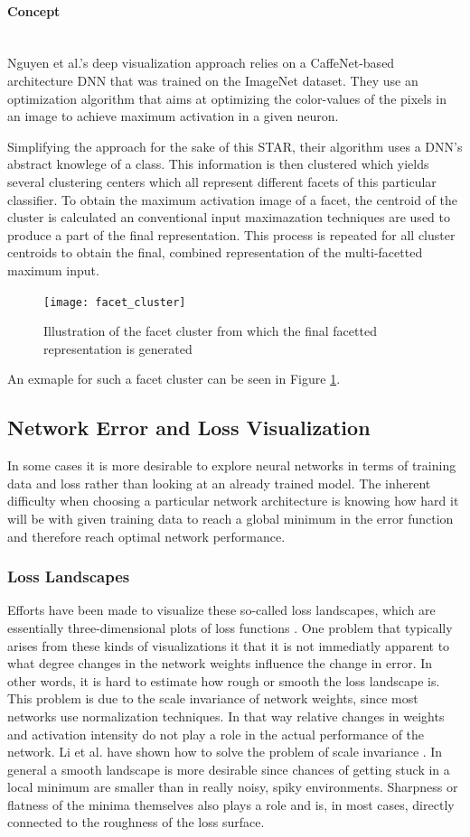 \documentclass{acmsiggraph}               %
\newcommand{\paragraphbr}[1]{\paragraph{#1}\mbox{}\\}
\begin{document}
\paragraphbr{Concept}

Nguyen et al.'s deep visualization approach relies on a CaffeNet-based architecture DNN that was trained on the ImageNet dataset. They use an optimization algorithm that aims at optimizing the color-values of the pixels in an image to achieve maximum activation in a given neuron.

Simplifying the approach for the sake of this STAR, their algorithm uses a DNN's abstract knowlege of a class. This information is then clustered which yields several clustering centers which all represent different facets of this particular classifier. To obtain the maximum activation image of a facet, the centroid of the cluster is calculated an conventional input maximazation techniques are used to produce a part of the final representation. This process is repeated for all cluster centroids to obtain the final, combined representation of the multi-facetted maximum input.

\begin{figure}
\center
\texttt{[image: facet\_cluster]}
\caption{Illustration of the facet cluster from which the final facetted representation is generated \protect\cite{Nguyen2016}}
\label{fig:facet_cluster}
\end{figure}

An exmaple for such a facet cluster can be seen in Figure \ref{fig:facet_cluster}.


\subsection{Network Error and Loss Visualization}
In some cases it is more desirable to explore neural networks in terms of training data and loss rather than looking at an already trained model.
The inherent difficulty when choosing a particular network architecture is knowing how hard it will be with given training data to reach a global minimum in the error function and therefore reach optimal network performance.

\subsubsection{Loss Landscapes}
Efforts have been made to visualize these so-called loss landscapes, which are essentially three-dimensional plots of loss functions \cite{Li2017}.
One problem that typically arises from these kinds of visualizations it that it is not immediatly apparent to what degree changes in the network weights influence the change in error. In other words, it is hard to estimate how rough or smooth the loss landscape is. This problem is due to the scale invariance of network weights, since most networks use normalization techniques. In that way relative changes in weights and activation intensity do not play a role in the actual performance of the network. Li et al. have shown how to solve the problem of scale invariance \cite{Li2017}. In general a smooth landscape is more desirable since chances of getting stuck in a local minimum are smaller than in really noisy, spiky environments. Sharpness or flatness of the minima themselves also plays a role and is, in most cases, directly connected to the roughness of the loss surface.
\end{document}
